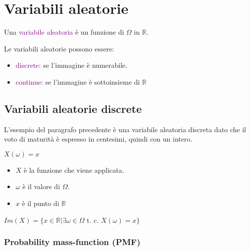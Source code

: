 \chapter{Variabili aleatorie}

Una \textcolor{purple}{variabile aleatoria} è un funzione di $\Omega$ in $\mathbb{R}$.


Le variabili aleatorie possono essere:

\begin{itemize}
    \item \textcolor{purple}{discrete}: se l'immagine è numerabile.
    \item \textcolor{purple}{continue}: se l'immagine è sottoinsieme di $\mathbb{R}$
\end{itemize}

\section{Variabili aleatorie discrete}

L'esempio del paragrafo precedente è una variabile aleatoria discreta dato che il voto di maturità è espresso in centesimi, quindi con un intero.

\begin{center}
    $X(\omega) = x$
\end{center}

\begin{itemize}
    \item $X$ è la funzione che viene applicata.
    \item $\omega$ è il valore di $\Omega$.
    \item $x$ è il punto di $\mathbb{R}$
\end{itemize}

$Im(X) = \{ x \in \mathbb{R} | \exists \omega \in \Omega$ t. c. $X(\omega) = x \}$

\subsection{Probability mass-function (PMF)}


